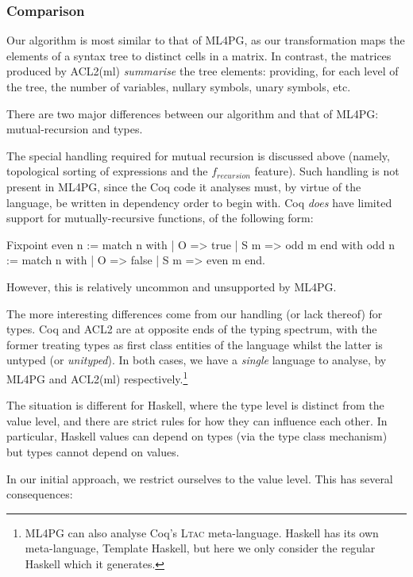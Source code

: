 \subsubsection{Comparison}

Our algorithm is most similar to that of ML4PG, as our transformation maps the elements of a syntax tree to distinct cells in a matrix. In contrast, the matrices produced by ACL2(ml) \emph{summarise} the tree elements: providing, for each level of the tree, the number of variables, nullary symbols, unary symbols, etc.

There are two major differences between our algorithm and that of ML4PG: mutual-recursion and types.

The special handling required for mutual recursion is discussed above (namely, topological sorting of expressions and the $f_{recursion}$ feature). Such handling is not present in ML4PG, since the Coq code it analyses must, by virtue of the language, be written in dependency order to begin with. Coq \emph{does} have limited support for mutually-recursive functions, of the following form:

\begin{coqblock}
Fixpoint even n := match n with
                       | O   => true
                       | S m => odd m
                   end
    with odd  n := match n with
                       | O   => false
                       | S m => even m
                   end.
\end{coqblock}

However, this is relatively uncommon and unsupported by ML4PG.

The more interesting differences come from our handling (or lack thereof) for types. Coq and ACL2 are at opposite ends of the typing spectrum, with the former treating types as first class entities of the language whilst the latter is untyped (or \emph{unityped}). In both cases, we have a \emph{single} language to analyse, by ML4PG and ACL2(ml) respectively.\footnote{ML4PG can also analyse Coq's \textsc{Ltac} meta-language. Haskell has its own meta-language, Template Haskell, but here we only consider the regular Haskell which it generates.}

The situation is different for Haskell, where the type level is distinct from the value level, and there are strict rules for how they can influence each other. In particular, Haskell values can depend on types (via the type class mechanism) but types cannot depend on values.

In our initial approach, we restrict ourselves to the value level. This has several consequences:

